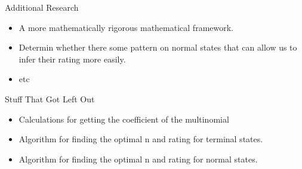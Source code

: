 \documentclass{beamer}
\begin{document}
\begin{frame}{Additional Research}
    \begin{itemize}{}
        \item A more mathematically rigorous mathematical framework.
        \item Determin whether there some pattern on normal states that can allow us to infer their rating more easily.
        \item etc
    \end{itemize}
\end{frame}

\begin{frame}{Stuff That Got Left Out}
    \begin{itemize}{}
        \item Calculations for getting the coefficient of the multinomial
        \item Algorithm for finding the optimal n and rating for terminal states.
        \item Algorithm for finding the optimal n and rating for normal states.
    \end{itemize}
\end{frame}
\end{document}
